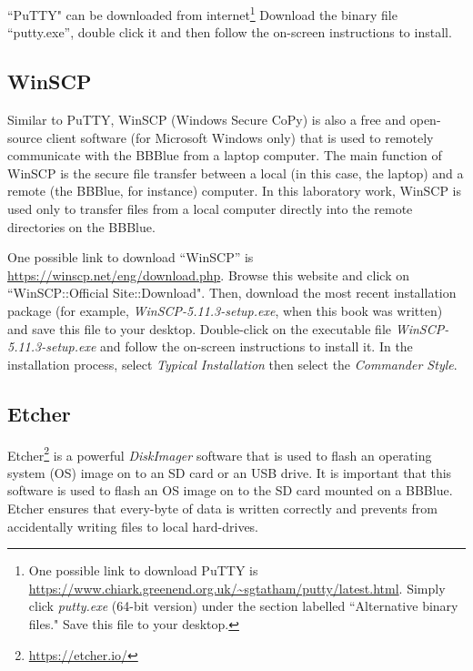 \begin{mdframed}[frametitle=Download and installation, backgroundcolor=yellow!5,
  roundcorner=7pt,outerlinecolor= blue!70!black,outerlinewidth=1.2]
  ``PuTTY" can be downloaded from internet\footnote{One possible link to
    download PuTTY is
    \url{https://www.chiark.greenend.org.uk/~sgtatham/putty/latest.html}. Simply
    click \emph{putty.exe}  (64-bit version) under the section labelled
    ``Alternative binary files." Save this file to your desktop.} Download the
  binary file ``putty.exe'', double click it and then follow the on-screen instructions to install. 
\end{mdframed}


\subsection{WinSCP}
\label{sec:winSCP}
Similar to PuTTY, WinSCP (Windows Secure CoPy) is also a free and open-source  client software (for Microsoft Windows only) that is used to remotely communicate with the BBBlue from a laptop computer. The main function of WinSCP is the secure file transfer between a local (in this case, the laptop) and a remote (the BBBlue, for instance) computer.  In this laboratory work, WinSCP is used only to transfer files from a local computer directly into the remote directories on the BBBlue. %

\begin{mdframed}[frametitle=Download and installation, backgroundcolor=yellow!5, roundcorner=7pt,outerlinecolor= blue!70!black,outerlinewidth=1.2]
  One possible link to download ``WinSCP'' is
  \url{https://winscp.net/eng/download.php}. Browse this website and click on
  ``WinSCP::Official Site::Download". Then, download the most recent
  installation package (for example, \emph{WinSCP-5.11.3-setup.exe}, when this
  book was written) and save this file to your desktop. Double-click on the executable file \emph{WinSCP-5.11.3-setup.exe} and follow the on-screen instructions to install it. In the installation process, select \emph{Typical Installation} then select the \emph{Commander Style}.
\end{mdframed}

\subsection{Etcher}
\label{sec:etcher}

Etcher\footnote{\href{https://etcher.io/}{https://etcher.io/}} is a powerful
\emph{DiskImager} software that is used to flash an operating system (OS) image
on to an SD card or an USB drive. It is important that this software is used to
flash an OS image on to the SD card mounted on a BBBlue. Etcher ensures that
every-byte of data is written correctly and prevents from accidentally writing
files to local hard-drives.


